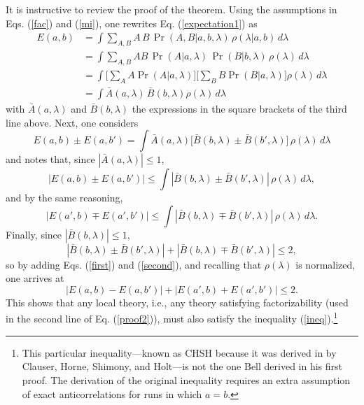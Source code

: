 \documentclass[letterpaper,12pt]{article}
\begin{document}
It is instructive to review the proof of the theorem. Using the assumptions in Eqs. (\ref{fac}) and (\ref{mi}), one rewrites Eq. (\ref{expectation1}) as
	\begin{equation} \label{proof2}
	\begin{split}
	E(a,b) & = \int \sum_{A,B} A \, B \, \Pr(A,B|a,b,\lambda) \, \rho(\lambda|a,b) \, d\lambda\\
	&= \int \sum_{A,B} A B \, \Pr(A|a,\lambda) \, \Pr(B|b,\lambda) \, \rho(\lambda) \, d\lambda \\
	&= \int \bigg[ \sum_{A} A \Pr(A|a,\lambda) \bigg] \bigg[ \sum_{B} B \Pr(B|a,\lambda) \bigg] \rho(\lambda) \, d\lambda \\
	&= \int \bar{A}(a,\lambda) \, \bar{B}(b,\lambda) \rho(\lambda) \, d\lambda
	\end{split}
	\end{equation}
with $\bar{A}(a,\lambda)$ and $\bar{B}(b,\lambda)$ the expressions in the square brackets of the third line above. Next, one considers
	\begin{equation}\label{E-E}
	E(a,b) \pm E(a,b') = \int \bar{A}(a,\lambda) \big[ \bar{B}(b,\lambda) \pm \bar{B}(b',\lambda) \big] \, \rho(\lambda) \, d\lambda
	\end{equation}
and notes that, since $| \bar{A}(a,\lambda) | \leq 1$,
	\begin{equation}\label{first}
	|E(a,b) \pm E(a,b')| \leq \int | \bar{B}(b,\lambda) \pm \bar{B}(b',\lambda) | \, \rho(\lambda) \, d\lambda ,
	\end{equation}
and by the same reasoning, 
	\begin{equation}\label{second}
	|E(a',b) \mp E(a',b')| \leq \int | \bar{B}(b,\lambda) \mp \bar{B}(b',\lambda) | \, \rho(\lambda) \, d\lambda .
	\end{equation}
Finally, since $| \bar{B}(b,\lambda) | \leq 1$,
\begin{equation}
	|\bar{B}(b,\lambda) \pm \bar{B}(b',\lambda)| + |\bar{B}(b,\lambda) \mp \bar{B}(b',\lambda)| \leq 2,
	\end{equation}
so by adding Eqs. (\ref{first}) and (\ref{second}), and recalling that $\rho(\lambda)$ is normalized, one arrives at
\begin{equation}\label{ineq}
	|E(a,b) - E(a,b')| + |E(a',b) + E(a',b')| \leq 2.
	\end{equation}
This shows that any local theory, i.e., any theory satisfying factorizability (used in the second line of Eq. (\ref{proof2})), must also satisfy the inequality (\ref{ineq}).\footnote{This particular inequality---known as CHSH because it was derived in \cite{Clauser1969} by Clauser, Horne, Shimony, and Holt---is not the one Bell derived in his first proof. The derivation of the original inequality requires an extra assumption of exact anticorrelations for runs in which $a=b$.}
\end{document}

